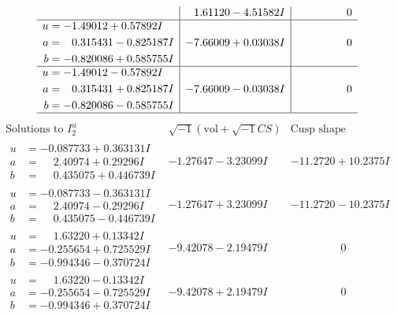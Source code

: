 \documentclass[1p]{elsarticle_modified}
\theoremstyle{definition}
\newcommand{\I}{\sqrt{-1}}
\begin{document}
$$\begin{array}{c|c|c}
 & \phantom{-}1.61120 - 4.51582 I & \phantom{-0.000000 } 0 \\ \hline\begin{aligned}
u &= -1.49012 + 0.57892 I \\
a &= \phantom{-}0.315431 - 0.825187 I \\
b &= -0.820086 + 0.585755 I\end{aligned}
 & -7.66009 + 0.03038 I & \phantom{-0.000000 } 0 \\ \hline\begin{aligned}
u &= -1.49012 - 0.57892 I \\
a &= \phantom{-}0.315431 + 0.825187 I \\
b &= -0.820086 - 0.585755 I\end{aligned}
 & -7.66009 - 0.03038 I & \phantom{-0.000000 } 0\\
 \hline 
 \end{array}$$\newpage$$\begin{array}{c|c|c}  
\text{Solutions to }I^u_{2}& \I (\text{vol} + \sqrt{-1}CS) & \text{Cusp shape}\\
 \hline 
\begin{aligned}
u &= -0.087733 + 0.363131 I \\
a &= \phantom{-}2.40974 + 0.29296 I \\
b &= \phantom{-}0.435075 + 0.446739 I\end{aligned}
 & -1.27647 - 3.23099 I & -11.2720 + 10.2375 I \\ \hline\begin{aligned}
u &= -0.087733 - 0.363131 I \\
a &= \phantom{-}2.40974 - 0.29296 I \\
b &= \phantom{-}0.435075 - 0.446739 I\end{aligned}
 & -1.27647 + 3.23099 I & -11.2720 - 10.2375 I \\ \hline\begin{aligned}
u &= \phantom{-}1.63220 + 0.13342 I \\
a &= -0.255654 + 0.725529 I \\
b &= -0.994346 - 0.370724 I\end{aligned}
 & -9.42078 - 2.19479 I & \phantom{-0.000000 } 0 \\ \hline\begin{aligned}
u &= \phantom{-}1.63220 - 0.13342 I \\
a &= -0.255654 - 0.725529 I \\
b &= -0.994346 + 0.370724 I\end{aligned}
 & -9.42078 + 2.19479 I & \phantom{-0.000000 } 0 \\ \hline\begin{aligned}

\end{aligned}
\end{array}$$
\end{document}
